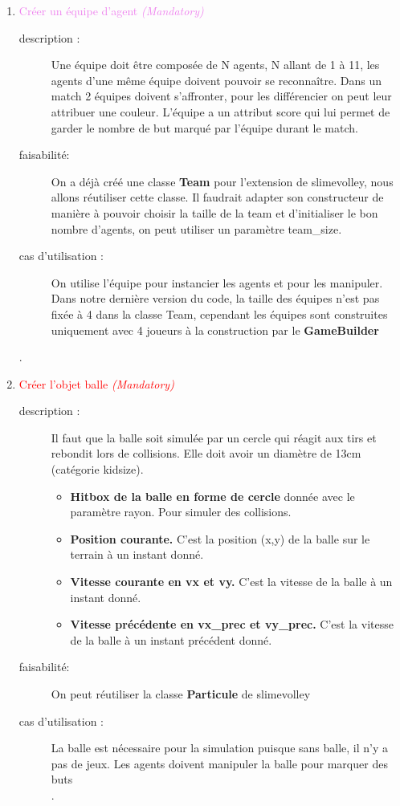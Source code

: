 \documentclass[11pt, a4paper]{article}
\newcommand{\besoinVItem}[4]{
	\item #1
	\begin{description}
		\item[description :]
		#2
		\item[faisabilité: ]
		#3
		\item[cas d'utilisation :]
		#4
	\end{description}
}
\begin{document}
\begin{enumerate}
\begin{enumerate}
{			}
			{
				Pour entrainer et faire jouer l'agent on a besoin de lui donner une perception de l'environnement.
			}

			\besoinVItem{\textcolor{violet}{Créer un équipe d'agent \textit{(Mandatory)}}}
			{Une équipe doit être composée de N agents, N allant de 1 à 11, les agents d'une même équipe doivent pouvoir se reconnaître. Dans un match 2 équipes doivent s'affronter, pour les différencier on peut leur attribuer une couleur. L'équipe a un attribut score qui lui permet de garder le nombre de but marqué par l'équipe durant le match.\label{besoinTeam}
			}
			{On a déjà créé une classe \textbf{Team} pour l'extension de slimevolley, nous allons réutiliser cette classe. Il faudrait adapter son constructeur de manière à pouvoir choisir la taille de la team et d'initialiser le bon nombre d'agents, on peut utiliser un paramètre team\_size.  }
			{On utilise l'équipe pour instancier les agents et pour les manipuler.\\
			Dans notre dernière version du code, la taille des équipes n'est pas fixée à 4 dans la classe Team, cependant les équipes sont construites uniquement avec 4 joueurs à la construction par le \textbf{GameBuilder}}.


			\besoinVItem{\textcolor{red}{Créer l'objet balle \textit{(Mandatory)}} }
			{	Il faut que la balle soit simulée par un cercle qui réagit aux tirs et rebondit lors de collisions. Elle doit avoir un diamètre de 13cm (catégorie kidsize).
				\begin{itemize}
					\item \textbf{Hitbox de la balle en forme de cercle} donnée avec le paramètre rayon.
					Pour simuler des collisions.
					\item \textbf{Position courante.}
					C'est la position (x,y) de la balle sur le terrain à un instant donné.

					\item \textbf{Vitesse courante en vx et vy.}
					C'est la vitesse de la balle à un instant donné.

					\item \textbf{Vitesse précédente en vx\_prec et vy\_prec.}
					C'est la vitesse de la balle à un instant précédent donné.
				\end{itemize}
			}{On peut réutiliser la classe \textbf{Particule} de slimevolley

			}{La balle est nécessaire pour la simulation puisque sans balle, il n'y a pas de jeux. Les agents doivent manipuler la balle pour marquer des buts\\.
			}


\end{enumerate}
\end{enumerate}
\end{document}
